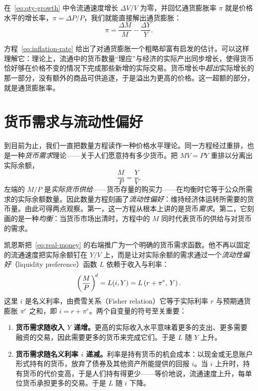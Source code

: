 在~\eqref{eq:qty-growth} 中令流通速度增长 $\Delta V / V$ 为零，并回忆通货膨胀率 $\pi$ 就是价格水平的增长率，$\pi = \Delta P / P$，我们就能直接解出通货膨胀：
\begin{equation}
\pi = \frac{\Delta M}{M} - \frac{\Delta Y}{Y}.
\label{eq:inflation-rate}
\end{equation}


方程~\eqref{eq:inflation-rate} 给出了对通货膨胀一个粗略却富有启发的估计。可以这样理解它：理论上，流通中的货币数量“理应”与经济的实际产出同步增长，使得货币恰好够在价格不变的情况下完成那些新增的实际交易。货币增长中\emph{超出}实际增长的那一部分，没有额外的商品可供追逐，于是溢出为更高的价格。这一超额的部分，就是通货膨胀率。

\section{货币需求与流动性偏好}
\label{sec:money-demand}

到目前为止，我们一直把数量方程读作一种价格水平理论。同一方程经过重排，也是一种\emph{货币需求}理论——关于人们愿意持有多少货币。把 $MV = PY$ 重排以分离出实际余额，
\begin{equation}
\frac{M}{P} = \frac{Y}{V}.
\label{eq:real-money}
\end{equation}
左端的 $M/P$ 是\emph{实际货币供给}——货币存量的购买力——在均衡时它等于公众所需求的实际余额数量。因此数量方程刻画了\emph{流动性偏好}：维持经济体运转所需要的货币量。由此可得两点观察。第一，这一方程从根本上讲的是货币\emph{需求}。第二，它刻画的是一种\emph{均衡}：当货币市场出清时，方程中的 $M$ 同时代表货币的供给与对货币的需求。

凯恩斯把~\eqref{eq:real-money} 的右端推广为一个明确的货币需求函数。他不再以固定的流通速度把实际余额钉在 $Y/V$ 上，而是让对实际余额的需求通过一个\emph{流动性偏好}（liquidity preference）函数 $L$ 依赖于收入与利率：
\begin{equation}
\left(\frac{M}{P}\right)^{\!d} = L(i, Y) = L\left(r + \pi^{e},\, Y\right).
\label{eq:liq-pref}
\end{equation}
这里 $i$ 是名义利率，由费雪关系（Fisher relation）它等于实际利率 $r$ 与预期通货膨胀 $\pi^{e}$ 之和，即 $i = r + \pi^{e}$。两个自变量的符号至关重要：
\begin{enumerate}
    \item \textbf{货币需求随收入 $Y$ 递增。}更高的实际收入水平意味着更多的支出、更多需要融资的交易，因此需要更多的货币来完成它们。于是 $L$ 随 $Y$ 上升。
    \item \textbf{货币需求随名义利率 $i$ 递减。}利率是持有货币的机会成本：以现金或无息账户形式持有的货币，放弃了债券及其他资产所能提供的回报 $i$。当 $i$ 上升时，持有货币的代价变高，于是人们持有得更少——等价地说，流通速度上升，每单位货币承担更多的交易。于是 $L$ 随 $i$ 下降。
\end{enumerate}

